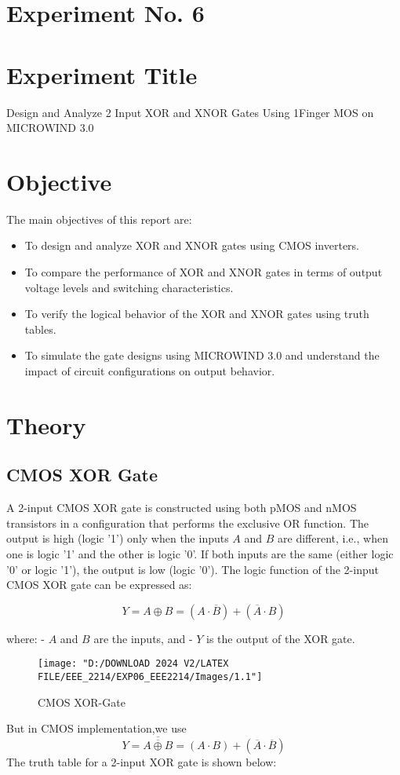 \documentclass[a4paper,12pt]{article}
\begin{document}
	\section{Experiment No. 6}
	
	
	\section{Experiment Title }
	Design and Analyze 2 Input XOR and XNOR Gates Using 1Finger MOS on
	MICROWIND 3.0
	\section{Objective}
	The main objectives of this report are:
	\begin{itemize}
		\item To design and analyze XOR and XNOR gates using CMOS inverters.
		\item To compare the performance of XOR and XNOR gates in terms of output voltage levels and switching characteristics.
		\item To verify the logical behavior of the XOR and XNOR gates using truth tables.
		\item To simulate the gate designs using MICROWIND 3.0 and understand the impact of circuit configurations on output behavior.
	\end{itemize}
	
	\section{Theory}
	\subsection{CMOS XOR Gate}
	A 2-input CMOS XOR gate is constructed using both pMOS and nMOS transistors in a configuration that performs the exclusive OR function. The output is high (logic '1') only when the inputs \( A \) and \( B \) are different, i.e., when one is logic '1' and the other is logic '0'. If both inputs are the same (either logic '0' or logic '1'), the output is low (logic '0'). The logic function of the 2-input CMOS XOR gate can be expressed as:
	
	\[
	Y = A \oplus B = (A \cdot \overline{B}) + (\overline{A} \cdot B)
	\]
	
	where:
	- \( A \) and \( B \) are the inputs, and
	- \( Y \) is the output of the XOR gate.
	
	\begin{figure}[H]
		\centering
			\texttt{[image: "D:/DOWNLOAD 2024 V2/LATEX FILE/EEE\_2214/EXP06\_EEE2214/Images/1.1"]}
		\caption{CMOS XOR-Gate}
		\label{fig:xor_gate}
	\end{figure}
	But in CMOS implementation,we use 
		\[
	Y = \overline{\overline{A \oplus B}} = (A \cdot B) + (\overline{A} \cdot \overline{B})
	\]
	The truth table for a 2-input XOR gate is shown below:
	
\end{document}
